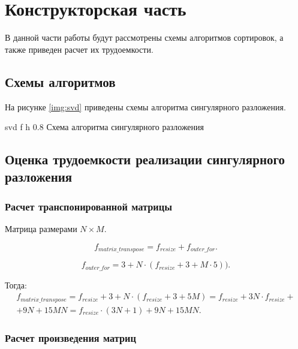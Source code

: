 \chapter{Конструкторская часть}
В данной части работы будут рассмотрены схемы алгоритмов сортировок, а также приведен расчет их трудоемкости.





\section{Схемы алгоритмов}
На рисунке \ref{img:svd} приведены схемы алгоритма сингулярного разложения.

{svd} %
{f} %
{h} %
{0.8\textwidth} %
{Схема алгоритма сингулярного разложения} %






\section{Оценка трудоемкости реализации сингулярного разложения}
\subsection{Расчет транспонированной матрицы}
Матрица размерами $N \times M$.

\begin{equation}
	f_{matrix\_transpose} = f_{resize} + f_{outer\_for}.
\end{equation}

\begin{equation}
	f_{outer\_for} = 3 + N \cdot (f_{resize} + 3 + M \cdot 5)).
\end{equation}

Тогда:
\begin{equation}
	\begin{gathered}
		f_{matrix\_transpose} = f_{resize} + 3 + N \cdot (f_{resize} + 3 + 5M) = f_{resize} + 3N \cdot f_{resize} + \\ + 9N + 15MN= f_{resize} \cdot (3N + 1) + 9N + 15MN.
	\end{gathered}
\end{equation}

\subsection{Расчет произведения матриц}

